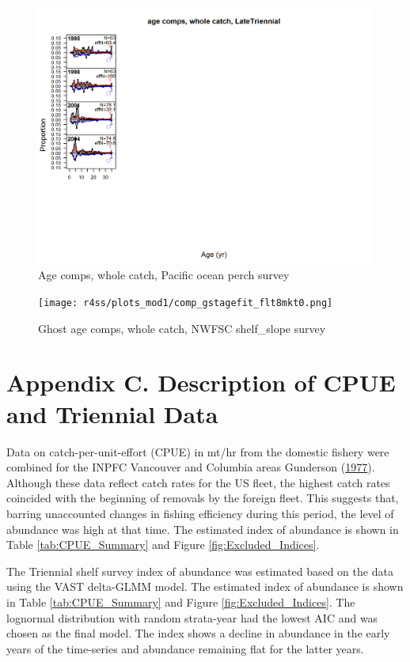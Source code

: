 \documentclass[12pt,]{article}
\begin{document}
\begin{figure}
\centering
\includegraphics{r4ss/plots_mod1/comp_agefit_flt4mkt0.png}
\caption{Age comps, whole catch, Pacific ocean perch survey
\label{fig:age_fits}}
\end{figure}

\begin{figure}
\centering
\texttt{[image: r4ss/plots\_mod1/comp\_gstagefit\_flt8mkt0.png]}
\caption{Ghost age comps, whole catch, NWFSC shelf\_slope survey
\label{fig:age_fits}}
\end{figure}

\FloatBarrier

\section{Appendix C. Description of CPUE and Triennial
Data}\label{appendix-c.-description-of-cpue-and-triennial-data}

Data on catch-per-unit-effort (CPUE) in mt/hr from the domestic fishery
were combined for the INPFC Vancouver and Columbia areas Gunderson
(\protect\hyperlink{ref-gunderson_population_1977}{1977}). Although
these data reflect catch rates for the US fleet, the highest catch rates
coincided with the beginning of removals by the foreign fleet. This
suggests that, barring unaccounted changes in fishing efficiency during
this period, the level of abundance was high at that time. The estimated
index of abundance is shown in Table \ref{tab:CPUE_Summary} and Figure
\ref{fig:Excluded_Indices}.

The Triennial shelf survey index of abundance was estimated based on the
data using the VAST delta-GLMM model. The estimated index of abundance
is shown in Table \ref{tab:CPUE_Summary} and Figure
\ref{fig:Excluded_Indices}. The lognormal distribution with random
strata-year had the lowest AIC and was chosen as the final model. The
index shows a decline in abundance in the early years of the time-series
and abundance remaining flat for the latter years.
\end{document}
